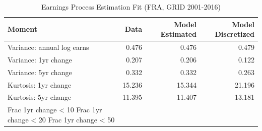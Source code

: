 \begin{table}
\caption{Earnings Process Estimation Fit (FRA, GRID 2001-2016)}
\label{tab:earnings_fit_fra}
\begin{tabular}{lrrr}
\toprule
Moment & Data & Model Estimated & Model Discretized \\
\midrule
Variance: annual log earns & 0.476 & 0.476 & 0.479 \\
Variance: 1yr change & 0.207 & 0.206 & 0.122 \\
Variance: 5yr change & 0.332 & 0.332 & 0.263 \\
Kurtosis: 1yr change & 15.236 & 15.344 & 21.196 \\
Kurtosis: 5yr change & 11.395 & 11.407 & 13.181 \\
Frac 1yr change < 10%
Frac 1yr change < 20%
Frac 1yr change < 50%
\bottomrule
\end{tabular}
\end{table}

